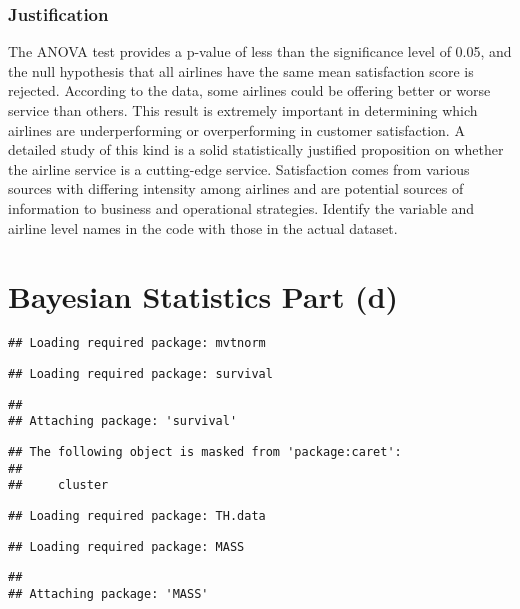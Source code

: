 \documentclass[
]{article}
\begin{document}
\subsubsection{Justification}\label{justification-2}

The ANOVA test provides a p-value of less than the significance level of
0.05, and the null hypothesis that all airlines have the same mean
satisfaction score is rejected. According to the data, some airlines
could be offering better or worse service than others. This result is
extremely important in determining which airlines are underperforming or
overperforming in customer satisfaction. A detailed study of this kind
is a solid statistically justified proposition on whether the airline
service is a cutting-edge service. Satisfaction comes from various
sources with differing intensity among airlines and are potential
sources of information to business and operational strategies. Identify
the variable and airline level names in the code with those in the
actual dataset.

\section{Bayesian Statistics Part (d)}\label{bayesian-statistics-part-d}

\begin{verbatim}
## Loading required package: mvtnorm
\end{verbatim}

\begin{verbatim}
## Loading required package: survival
\end{verbatim}

\begin{verbatim}
## 
## Attaching package: 'survival'
\end{verbatim}

\begin{verbatim}
## The following object is masked from 'package:caret':
## 
##     cluster
\end{verbatim}

\begin{verbatim}
## Loading required package: TH.data
\end{verbatim}

\begin{verbatim}
## Loading required package: MASS
\end{verbatim}

\begin{verbatim}
## 
## Attaching package: 'MASS'
\end{verbatim}
\end{document}
